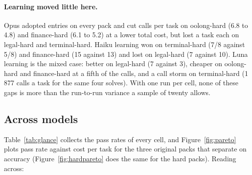 \documentclass[11pt,a4paper]{article}
\begin{document}
\paragraph{Learning moved little here.} Opus adopted entries on every pack
and cut calls per task on oolong-hard (6.8 to 4.8) and finance-hard (6.1 to
5.2) at a lower total cost, but lost a task each on legal-hard and
terminal-hard. Haiku learning won on terminal-hard (7/8 against 5/8) and
finance-hard (15 against 13) and lost on legal-hard (7 against 10). Luna
learning is the mixed case: better on legal-hard (7 against 3), cheaper on
oolong-hard and finance-hard at a fifth of the calls, and a call storm on
terminal-hard (1\,877 calls a task for the same four solves). With one run
per cell, none of these gaps is more than the run-to-run variance a sample
of twenty allows.

\FloatBarrier
\subsection{Across models}
\label{sec:across}

Table~\ref{tab:glance} collects the pass rates of every cell, and
Figure~\ref{fig:pareto} plots pass rate against cost per task for the three
original packs that separate on accuracy (Figure~\ref{fig:hardpareto} does
the same for the hard packs). Reading across:
\end{document}
